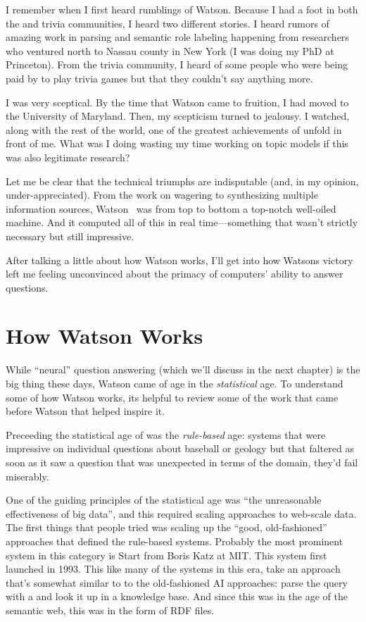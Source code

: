 

I remember when I first heard rumblings of Watson.
%
Because I had a foot in both the  and trivia communities, I
heard two different stories.
%
I heard rumors of amazing work in parsing and semantic role labeling
happening from researchers who ventured north to Nassau county in New
York (I was doing my PhD at Princeton).
%
From the trivia community, I heard of some people who were being paid
by  to play trivia games but that they couldn't say anything
more.

I was very sceptical.
%
By the time that Watson came to fruition, I had moved to the
University of Maryland.
%
Then, my scepticism turned to jealousy.
%
I watched, along with the rest of the world, one of the greatest
achievements of  unfold in front of me.
%
What was I doing wasting my time working on topic models if this was
also legitimate research?

Let me be clear that the technical triumphs are indisputable (and, in
my opinion, under-appreciated).
%
From the work on wagering to synthesizing multiple information
sources, Watson~\citep{ferruci-10} was from top to bottom a top-notch well-oiled machine.
%
And it computed all of this in real time---something that wasn't
strictly necessary but still impressive.

After talking a little about how Watson works, I'll get into how
Watsons victory left me feeling unconvinced about the primacy of
computers' ability to answer questions.

\section{How Watson Works}

While ``neural'' question answering (which we'll discuss in the next
chapter) is the big thing these days, Watson came of age in the
\emph{statistical} age.
%
To understand some of how Watson works, its helpful to review some of
the work that came before Watson that helped inspire it.

Preceeding the statistical age of  was the \emph{rule-based}
age: systems that were impressive on individual questions about
baseball or geology but that faltered as soon as it saw a question
that was unexpected in terms of the domain, they'd fail miserably.

One of the guiding principles of the statistical age was ``the
unreasonable effectiveness of big data'', and this required scaling 
approaches to web-scale data.
%
The first things that people tried was scaling up the ``good,
old-fashioned'' approaches that defined the rule-based systems.
%
Probably the most prominent system in this category is Start from Boris Katz at MIT.  This system first launched in 1993.  This like many of the systems in this era, take an approach that’s somewhat similar to to the old-fashioned AI approaches: parse the query with a  and look it up in a knowledge base.  And since this was in the age of the semantic web, this was in the form of RDF files.  

